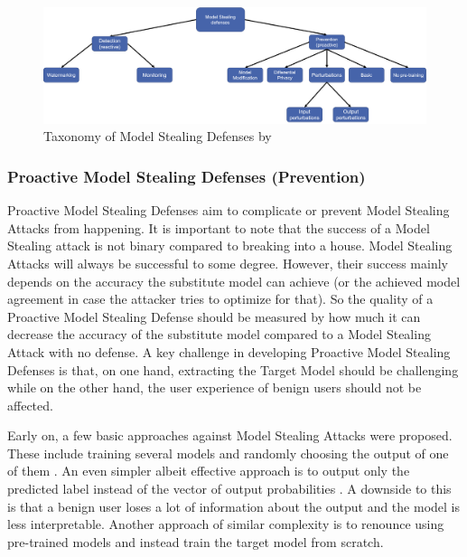\begin{figure} [ht]
    \centering
    \includegraphics[width=.9\linewidth]{images/MS_defenses_Taxonomy.png}
    \caption[Model Stealing Defenses Taxonomy]{Taxonomy of Model Stealing Defenses by \cite{oliynyk2022know}}
    \label{fig:ModelStealingDefenses:Taxonomy}
  \end{figure}

\subsubsection{Proactive Model Stealing Defenses (Prevention)}
\label{sec:ModelStealing:Defenses:Prevention}
Proactive Model Stealing Defenses aim to complicate or prevent Model Stealing Attacks from happening. It is important to note that the success of a Model Stealing attack is not binary
compared to breaking into a house. Model Stealing Attacks will always be successful to some degree. However, their success mainly depends on the accuracy the substitute model
can achieve (or the achieved model agreement in case the attacker tries to optimize for that). So the quality of a Proactive Model Stealing Defense should be measured by how much it can 
decrease the accuracy of the substitute model compared to a Model Stealing Attack with no defense. A key challenge in developing Proactive Model Stealing Defenses is that, on one hand,
extracting the Target Model should be challenging while on the other hand, the user experience of benign users should not be affected. \par
Early on, a few basic approaches against Model Stealing Attacks were proposed. These include training several models and randomly choosing the output of one of them 
\cite{alabdulmohsin2014adding}. An even simpler albeit effective approach is to output only the predicted label instead of the vector of output probabilities \cite{tramer2016stealing}.
A downside to this is that a benign user loses a lot of information about the output and the model is less interpretable. Another approach of similar complexity is to renounce
using pre-trained models \cite{atli2020extraction} and instead train the target model from scratch. \par
